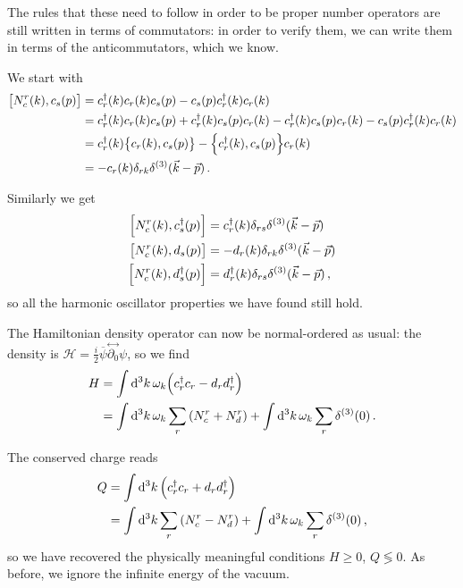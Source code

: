 \documentclass[main.tex]{subfiles}
\begin{document}
The rules that these need to follow in order to be proper number operators are still written in terms of commutators: in order to verify them, we can write them in terms of the anticommutators, which we know. 

We start with 
%
\begin{subequations}
\begin{align}
\qty[N_c^{r} (k), c_s (p)] &= c_r ^\dag (k) c_r (k) c_s (p) -  c_s (p) c_r ^\dag (k) c_r (k)  \\
&= c_r ^\dag (k) c_r (k) c_s (p) + c_r ^\dag (k) c_s (p) c_r (k)
- c_r ^\dag (k) c_s (p) c_r (k) -  c_s (p) c_r ^\dag (k) c_r (k)  \\
&= c_r ^\dag (k) \qty{c_r (k), c_s (p)} - \qty{c_r ^\dag (k), c_s (p)} c_r (k)  \\
&= - c_r (k) \delta_{rk} \delta^{(3)} (\vec{k} - \vec{p})
\,.
\end{align}
\end{subequations}

Similarly we get 
%
\begin{subequations}
\begin{align}
\qty[N_c^{r} (k), c_s ^\dag (p)] &= c_r ^\dag (k) \delta_{rs} \delta^{(3)} (\vec{k} - \vec{p})  \\
\qty[N_c^{r} (k), d_s (p)] &= - d_r (k) \delta_{rk} \delta^{(3)} (\vec{k} - \vec{p}) \\
\qty[N_c^{r} (k), d_s ^\dag (p)] &= d_r ^\dag (k) \delta_{rs} \delta^{(3)} (\vec{k} - \vec{p}) 
\,,
\end{align}
\end{subequations}
%
so all the harmonic oscillator properties we have found still hold. 

The Hamiltonian density operator can now be normal-ordered as usual: the density is \(\mathscr{H} = \frac{i}{2} \overline{\psi} \overset{\leftrightarrow}{\partial_0 } \psi \), so we find
%
\begin{subequations}
\begin{align}
H &= \int \dd[3]{k} \omega_{k} \qty(c_r ^\dag c_r - d_r d_r ^\dag)  \\
&= \int \dd[3]{k} \omega_{k} \sum _{r} \qty(N_c^{r} + N_d^{r}) + \int \dd[3]{k} \omega_{k} \sum_{r} \delta^{(3)} (0)
\,.
\end{align}
\end{subequations}

The conserved charge reads 
%
\begin{subequations}
\begin{align}
Q &= \int \dd[3]{k}  \qty(c_r ^\dag c_r + d_r d_r ^\dag)  \\
&= \int \dd[3]{k}  \sum _{r} \qty(N_c^{r} - N_d^{r}) + \int \dd[3]{k} \omega_{k} \sum_{r} \delta^{(3)} (0) 
\,,
\end{align}
\end{subequations}
%
so we have recovered the physically meaningful conditions \(H \geq 0\), \(Q \lessgtr 0\). 
As before, we ignore the infinite energy of the vacuum. 
\end{document}
